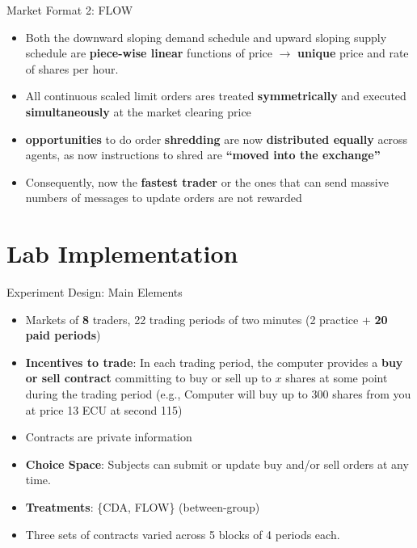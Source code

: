 \documentclass[10pt]{beamer}
\begin{document}
\begin{frame}{Market Format 2: FLOW}
\begin{itemize}
\item Both the downward sloping demand schedule and upward sloping supply schedule are \textbf{piece-wise linear} functions of price $\rightarrow$ \textbf{unique} price and rate of shares per hour. %
\item All continuous scaled limit orders ares treated \textbf{symmetrically} and executed \textbf{simultaneously} at the market clearing price %
        \item \textbf{opportunities} to do order \textbf{shredding} are now \textbf{distributed equally} across agents, as now instructions to shred are \textbf{``moved into the exchange''} %
        \item Consequently, now the
        \textbf{fastest trader} or the ones that can send massive numbers of messages to update orders are not rewarded
    \end{itemize}
\end{frame}

\section{Lab Implementation}

\begin{frame}{Experiment Design: Main Elements}
    \begin{itemize}
        \item Markets of \textbf{8} traders, 22 trading periods of two minutes (2 practice + \textbf{20 paid periods})
        \item \textbf{Incentives to trade}: In each trading period, the computer provides a \textbf{buy or sell contract} committing to buy or sell up to $x$ shares at some point during the trading period (e.g., Computer will buy up to 300 shares from you at price 13 ECU at second 115) 
        \item Contracts are private information %
        \item \textbf{Choice Space}: Subjects can submit or update buy and/or sell orders at any time. %
        \item \textbf{Treatments}: \{CDA, FLOW\} (between-group)
        \item Three sets of contracts varied across 5 blocks of 4 periods each. 
    \end{itemize}
\end{frame}
\end{document}
